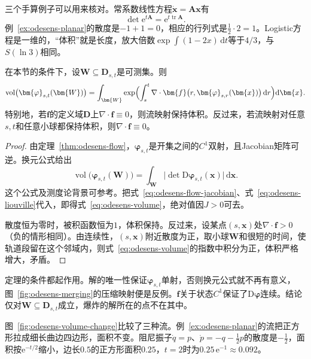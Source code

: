 三个手算例子可以用来核对。常系数线性方程$\dot{\bm{x}}=\bm{A}\bm{x}$有
\[
 \det\mathrm{e}^{t\bm{A}}=\mathrm{e}^{t\operatorname{tr}\bm{A}}.
\]
例~\ref{ex:odesens-planar}的散度是$-1+1=0$，相应的行列式是$\tfrac12\cdot2=1$。Logistic方程是一维的，“体积”就是长度，放大倍数$\exp\int(1-2x)\,\mathrm{d}t$等于$4/3$，与$S(\ln3)$相同。

\begin{theorem}[体积变化公式]
\label{thm:odesens-volume}
在本节的条件下，设$\bm{W}\subseteq\bm{D}_{s,t}$是可测集。则
\begin{equation}
 \operatorname{vol}\bigl(\bm{\varphi}_{s,t}(\bm{W})\bigr)=\int_{\bm{W}}\exp\Bigl(\int_{s}^{t}\nabla\cdot\bm{f}\bigl(r,\bm{\varphi}_{s,r}(\bm{x})\bigr)\,\mathrm{d}r\Bigr)\mathrm{d}\bm{x}.
 \label{eq:odesens-volume}
\end{equation}
特别地，若$\bm{f}$的定义域$\bm{D}$上$\nabla\cdot\bm{f}\equiv0$，则流映射保持体积。反过来，若流映射对任意$s,t$和任意小球都保持体积，则$\nabla\cdot\bm{f}\equiv0$。
\end{theorem}

\begin{proof}
由定理~\ref{thm:odesens-flow}，$\bm{\varphi}_{s,t}$是开集之间的$C^1$双射，且Jacobian矩阵可逆。换元公式给出
\[
 \operatorname{vol}\bigl(\bm{\varphi}_{s,t}(\bm{W})\bigr)=\int_{\bm{W}}\bigl\lvert\det\mathrm{D}\bm{\varphi}_{s,t}(\bm{x})\bigr\rvert\,\mathrm{d}\bm{x}.
\]
这个公式及测度论背景可参考。把式~\eqref{eq:odesens-flow-jacobian}、式~\eqref{eq:odesens-liouville}代入，即得式~\eqref{eq:odesens-volume}，绝对值因$J>0$可去。

散度恒为零时，被积函数恒为$1$，体积保持。反过来，设某点$(s,\bm{x})$处$\nabla\cdot\bm{f}>0$（负的情形相同）。由连续性，$(s,\bm{x})$附近散度为正，取小球$\bm{W}$和很短的时间，使轨道段留在这个邻域内，则式~\eqref{eq:odesens-volume}的指数中积分为正，体积严格增大，矛盾。
\end{proof}

定理的条件都起作用。解的唯一性保证$\bm{\varphi}_{s,t}$单射，否则换元公式就不再有意义，图~\ref{fig:odesens-merging}的压缩映射便是反例。$\bm{f}$关于状态$C^1$保证了$\mathrm{D}\bm{\varphi}$连续。结论仅对$\bm{W}\subseteq\bm{D}_{s,t}$成立，爆炸的解所在的点不在其中。

图~\ref{fig:odesens-volume-change}比较了三种流。例~\ref{ex:odesens-planar}的流把正方形拉成细长曲边四边形，面积不变。阻尼振子$\dot{q}=p$、$\dot{p}=-q-\tfrac12p$的散度是$-\tfrac12$，面积按$\mathrm{e}^{-t/2}$缩小，边长$0.5$的正方形面积$0.25$，$t=2$时为$0.25\,\mathrm{e}^{-1}\approx0.092$。

